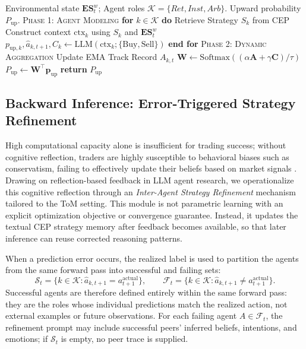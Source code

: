 \documentclass[a4paper,fleqn,doubleblind]{cas-sc}
\newcommand{\keyword}[1]{\textcolor{keywordcolor}{\textbf{#1}}}
\newcommand{\phase}[1]{\Statex \textcolor{phasecolor}{\textsc{#1}}}
\begin{document}
\begin{algorithm}[t]
\caption{Agent Modeling and Dynamic Aggregation}
\label{alg:parallel_dynamic_aggregation}
\small
\begin{algorithmic}[1]
    \Require Environmental state $\mathbf{ES}_t^w$; Agent roles $\mathcal{K}=\{Ret, Inst, Arb\}$.
    \Ensure Upward probability $P_{\text{up}}$.
    \phase{Phase 1: Agent Modeling}
    \State \keyword{for} $k \in \mathcal{K}$ \keyword{do}
        \State \quad Retrieve Strategy $S_k$ from CEP
        \State \quad Construct context $\text{ctx}_k$ using $S_k$ and $\mathbf{ES}_t^w$
    \State \quad $p_{\text{up},k}, \hat{a}_{k,t+1}, C_k \leftarrow \text{LLM}(\text{ctx}_k; \{\text{Buy}, \text{Sell}\})$
    \State \keyword{end for}
    \phase{Phase 2: Dynamic Aggregation}
    \State Update EMA Track Record $A_{k,t}$
    \State $\mathbf{W} \leftarrow \text{Softmax}((\alpha \mathbf{A} + \gamma \mathbf{C}) / \tau)$
  \State $P_{\text{up}} \leftarrow \mathbf{W}^\top \mathbf{p}_{\text{up}}$
    \State \keyword{return} $P_{\text{up}}$
\end{algorithmic}
\end{algorithm}


\subsection{Backward Inference: Error-Triggered Strategy Refinement}
High computational capacity alone is insufficient for trading success; without cognitive reflection, traders are highly susceptible to behavioral biases such as conservatism, failing to effectively update their beliefs based on market signals \citep{corgnet2018makes}. Drawing on reflection-based feedback in LLM agent research, we operationalize this cognitive reflection through an \textit{Inter-Agent Strategy Refinement} mechanism tailored to the ToM setting. This module is not parametric learning with an explicit optimization objective or convergence guarantee. Instead, it updates the textual CEP strategy memory after feedback becomes available, so that later inference can reuse corrected reasoning patterns.

When a prediction error occurs, the realized label is used to partition the agents from the same forward pass into successful and failing sets:
\begin{equation}
\mathcal{S}_t=\{k\in\mathcal{K}: \hat{a}_{k,t+1}=a_{t+1}^{\text{actual}}\}, \qquad
\mathcal{F}_t=\{k\in\mathcal{K}: \hat{a}_{k,t+1}\neq a_{t+1}^{\text{actual}}\}.
\end{equation}
Successful agents are therefore defined entirely within the same forward pass: they are the roles whose individual predictions match the realized action, not external examples or future observations. For each failing agent $A \in \mathcal{F}_t$, the refinement prompt may include successful peers' inferred beliefs, intentions, and emotions; if $\mathcal{S}_t$ is empty, no peer trace is supplied.
\end{document}
